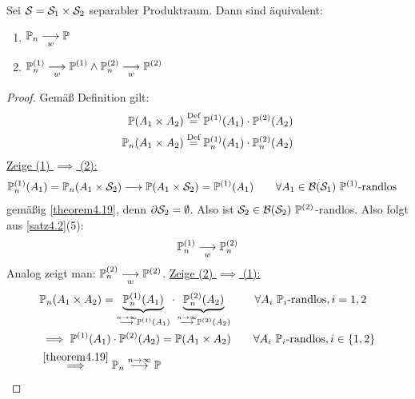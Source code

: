 \begin{theorem}\label{thoerem4.20}
Sei $\S=\S_1\times\S_2$ separabler Produktraum. Dann sind äquivalent:
\begin{enumerate}[label=(\arabic*)]
\item $\begin{aligned}
\P_n\stackrelnew{w}{}{\longrightarrow}\P
\end{aligned}$
\item $\begin{aligned}
\P_n^{(1)}\stackrelnew{w}{}{\longrightarrow}\P^{(1)}\wedge
\P_n^{(2)}\stackrelnew{w}{}{\longrightarrow}\P^{(2)}
\end{aligned}$
\end{enumerate}
\end{theorem}
\begin{proof}
Gemäß Definition gilt:
\begin{align*}
\P(A_1\times A_2)&\stackeq{\text{Def}}\P^{(1)}(A_1)\cdot\P^{(2)}(A_2)\\
\P_n(A_1\times A_2)&\stackeq{\text{Def}}\P_n^{(1)}(A_1)\cdot\P_n^{(2)}(A_2)\\
\end{align*}
\underline{Zeige (1) $\implies$ (2):}
\begin{align*}
\P_n^{(1)}(A_1)&=\P_n(A_1\times\S_2)\stackrel{}{\longrightarrow}\P(A_1\times\S_2)=\P^{(1)}(A_1)
\qquad\forall A_1\in\B(\S_1)~\P^{(1)}\text{-randlos}
\end{align*}
gemäßig \ref{theorem4.19}, denn $\partial\S_2=\emptyset$. Also ist $\S_2\in\B(\S_2)~\P^{(2)}$-randlos. Also folgt aus \ref{satz4.2}(5):
\begin{align*}
\P_n^{(1)}\stackrelnew{w}{}{\longrightarrow}\P_n^{(2)}
\end{align*}
Analog zeigt man: $\P_n^{(2)}\stackrelnew{w}{}{\longrightarrow}\P^{(2)}$.\nl
\underline{Zeige (2) $\implies$ (1):}
\begin{align*}
&\P_n(A_1\times A_2)=\underbrace{\P_n^{(1)}(A_1)}_{\stackrel{n\to\infty}{\longrightarrow}\P^{(1)}(A_1)}\cdot\underbrace{\P_n^{(2)}(A_2)}_{\stackrel{n\to\infty}{\longrightarrow}\P^{(2)}(A_2)}\qquad\forall A_i~\P_i\text{-randlos},i=1,2\\
&\implies
\P^{(1)}(A_1)\cdot\P^{(2)}(A_2)=\P(A_1\times A_2)\qquad\forall A_i~\P_i\text{-randlos},i\in\lbrace1,2\rbrace\\
&\stackrel{\ref{theorem4.19}}{\implies}\P_n\stackrel{n\to\infty}{\longrightarrow}\P
\end{align*}
\end{proof}

